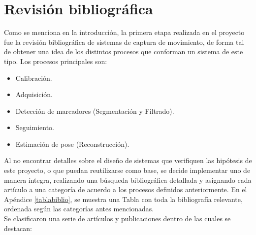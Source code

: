 \chapter{Revisión bibliográfica}
\label{invBiblio}

Como se menciona en la introducción, la primera etapa realizada en el proyecto fue la revisión bibliográfica de sistemas de captura de movimiento, de forma tal de obtener una idea de los distintos procesos que conforman un sistema de este tipo. Los procesos principales son:

\begin{itemize}
	\item Calibración.
	\item Adquisición.
	\item Detección de marcadores (Segmentación y Filtrado).
	\item Seguimiento.
	\item Estimación de pose (Reconstrucción).
\end{itemize}

Al no encontrar detalles sobre el diseño de sistemas que verifiquen las hipótesis de este proyecto, o que puedan reutilizarse como base, se decide implementar uno de manera íntegra, realizando una búsqueda bibliográfica detallada y asignando cada artículo a una categoría de acuerdo a los procesos definidos anteriormente. En el Apéndice \ref{tablabiblio}, se muestra una Tabla con toda la bibliografía relevante, ordenada según las categorías antes mencionadas.
\\ 

Se clasificaron una serie de artículos y publicaciones dentro de las cuales se destacan:

